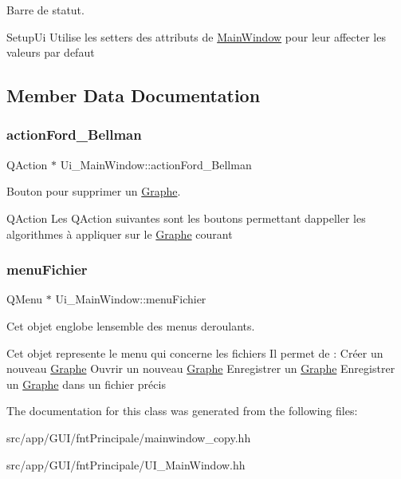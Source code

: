 Barre de statut. 

Setup\+Ui Utilise les setters des attributs de \hyperlink{classMainWindow}{Main\+Window} pour leur affecter les valeurs par defaut 

\subsection{Member Data Documentation}
\mbox{\label{classUi__MainWindow_aaefc17e81d820b51fedf1cdbfa948902}} 
\subsubsection{\texorpdfstring{action\+Ford\+\_\+\+Bellman}{actionFord\_Bellman}}
{\footnotesize\ttfamily Q\+Action $\ast$ Ui\+\_\+\+Main\+Window\+::action\+Ford\+\_\+\+Bellman}



Bouton pour supprimer un \hyperlink{classGraphe}{Graphe}. 

Q\+Action Les Q\+Action suivantes sont les boutons permettant d\textquotesingle{}appeller les algorithmes \`{a} appliquer sur le \hyperlink{classGraphe}{Graphe} courant \mbox{\label{classUi__MainWindow_a7ab5b88372fc7887d782937113c0ebbb}} 
\subsubsection{\texorpdfstring{menu\+Fichier}{menuFichier}}
{\footnotesize\ttfamily Q\+Menu $\ast$ Ui\+\_\+\+Main\+Window\+::menu\+Fichier}



Cet objet englobe l\textquotesingle{}ensemble des menus deroulants. 

Cet objet represente le menu qui concerne les fichiers Il permet de \+: Cr\'{e}er un nouveau \hyperlink{classGraphe}{Graphe} Ouvrir un nouveau \hyperlink{classGraphe}{Graphe} Enregistrer un \hyperlink{classGraphe}{Graphe} Enregistrer un \hyperlink{classGraphe}{Graphe} dans un fichier pr\'{e}cis 

The documentation for this class was generated from the following files\+:\begin{DoxyCompactItemize}
\item 
src/app/\+G\+U\+I/fnt\+Principale/mainwindow\+\_\+copy.\+hh\item 
src/app/\+G\+U\+I/fnt\+Principale/U\+I\+\_\+\+Main\+Window.\+hh\end{DoxyCompactItemize}
